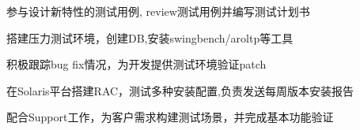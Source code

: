 \documentclass[]{deedy-resume-openfont}
\begin{document}
\begin{minipage}[t]{0.73\textwidth}
\begin{tightemize}
    \item 参与设计新特性的测试⽤例, review测试⽤例并编写测试计划书
    \item 搭建压⼒测试环境，创建DB,安装swingbench/aroltp等工具
    \item 积极跟踪bug fix情况，为开发提供测试环境验证patch
    \end{tightemize}
\sectionsep

\begin{tightemize}
    \item 在Solaris平台搭建RAC，测试多种安装配置,负责发送每周版本安装报告
    \item 配合Support工作，为客户需求构建测试场景，并完成基本功能验证
    \end{tightemize}
\sectionsep





\end{minipage}
\end{document}

